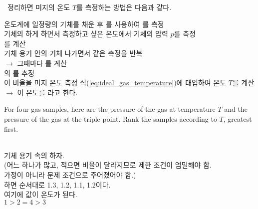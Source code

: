 \ 정리하면 미지의 온도 $T$를 측정하는 방법은 다음과 같다.
\begin{graybox}
\bnset
\bn 온도계에 일정량의 기체를 채운 후 를 사용하여 를 측정 \\
\bn 기체의 하게 하면서 측정하고 싶은 온도에서 기체의 압력 $p$를 측정 \\
\bn {}를 계산 \\
\bn 기체 용기 안의 기체 나가면서 같은 측정을 반복 \\
\bns $\longrightarrow$ 그때마다 를 계산 \\
\bn {}의 를 추정 \\
\bn 이 비율을 미지 온도 측정 식(\autoref{eq:ideal_gas_temperature})에 대입하여 온도 $T$를 계산 \\
\bns $\longrightarrow$ 이 온도를 라고 한다.
\end{graybox}

\begin{checkbox}
For four gas samples, here are the pressure of the gas at temperature $T$
and the pressure of the gas at the triple point.
Rank the samples according to $T$, greatest first. \\\vspace{-12pt}%
%
\vspace{0pt}%
\end{checkbox}

\begin{solbox}
\bnset
{} \\
\bn 기체 용기 속의 하자. \\
\bns (어느 하나가 많고, 적으면 비율이 달라지므로 제한 조건이 엄밀해야 함. \\
\bns 가정이 아니라 문제 조건으로 주어졌어야 함.) \\
%
\bn {}하면 순서대로 1.3, 1.2, 1.1, 1.2이다. \\
\bn 여기에  값이 온도가 된다. \\
 $1 > 2 = 4 > 3$
\end{solbox}
\clearpage